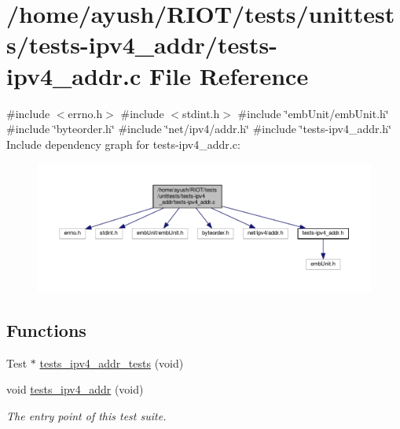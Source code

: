 \hypertarget{tests-ipv4__addr_8c}{}\section{/home/ayush/\+R\+I\+O\+T/tests/unittests/tests-\/ipv4\+\_\+addr/tests-\/ipv4\+\_\+addr.c File Reference}
\label{tests-ipv4__addr_8c}
{\ttfamily \#include $<$errno.\+h$>$}\newline
{\ttfamily \#include $<$stdint.\+h$>$}\newline
{\ttfamily \#include \char`\"{}emb\+Unit/emb\+Unit.\+h\char`\"{}}\newline
{\ttfamily \#include \char`\"{}byteorder.\+h\char`\"{}}\newline
{\ttfamily \#include \char`\"{}net/ipv4/addr.\+h\char`\"{}}\newline
{\ttfamily \#include \char`\"{}tests-\/ipv4\+\_\+addr.\+h\char`\"{}}\newline
Include dependency graph for tests-\/ipv4\+\_\+addr.c\+:
\nopagebreak
\begin{figure}[H]
\begin{center}
\leavevmode
\includegraphics[width=350pt]{tests-ipv4__addr_8c__incl}
\end{center}
\end{figure}
\subsection*{Functions}
\textbf{ }\par
\begin{DoxyCompactItemize}
\item 
Test $\ast$ \hyperlink{tests-ipv4__addr_8c_a7a782d342eb3ca2850cd4e091d7b27d7}{tests\+\_\+ipv4\+\_\+addr\+\_\+tests} (void)
\item 
void \hyperlink{group__unittests_ga629b2fe7a5d7d0f1623fbb0859868246}{tests\+\_\+ipv4\+\_\+addr} (void)
\begin{DoxyCompactList}\small\item\em The entry point of this test suite. \end{DoxyCompactList}\end{DoxyCompactItemize}



